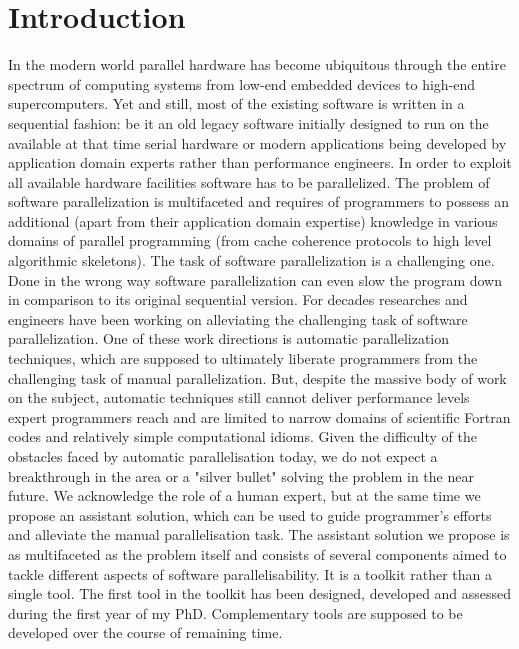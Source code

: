 \chapter{Introduction}





\quad In the modern world parallel hardware has become ubiquitous through the entire spectrum of computing systems from low-end embedded devices to high-end supercomputers. Yet and still, most of the existing software is written in a sequential fashion: be it an old legacy software initially designed to run on the available at that time serial hardware or modern applications being developed by application domain experts rather than performance engineers. In order to exploit all available hardware facilities software has to be parallelized.\newline\null
\quad The problem of software parallelization is multifaceted and requires of programmers to possess an additional (apart from their application domain expertise) knowledge in various domains of parallel programming (from cache coherence protocols to high level algorithmic skeletons). The task of software parallelization is a challenging one. Done in the wrong way software parallelization can even slow the program down in comparison to its original sequential version. For decades researches and engineers have been working on alleviating the challenging task of software parallelization. One of these work directions is automatic parallelization techniques, which are supposed to ultimately liberate programmers from the challenging task of manual parallelization. But, despite the massive body of work on the subject, automatic techniques still cannot deliver performance levels expert programmers reach and are limited to narrow domains of scientific Fortran codes and relatively simple computational idioms.\newline\null
\quad Given the difficulty of the obstacles faced by automatic parallelisation today, we do not expect a breakthrough in the area or a "silver bullet" solving the problem in the near future. We acknowledge the role of a human expert, but at the same time we propose an assistant solution, which can be used to guide programmer's efforts and alleviate the manual parallelisation task.\newline\null
\quad The assistant solution we propose is as multifaceted as the problem itself and consists of several components aimed to tackle different aspects of software parallelisability. It is a toolkit rather than a single tool. The first tool in the toolkit has been designed, developed and assessed during the first year of my PhD. Complementary tools are supposed to be developed over the course of remaining time.\newline\null
